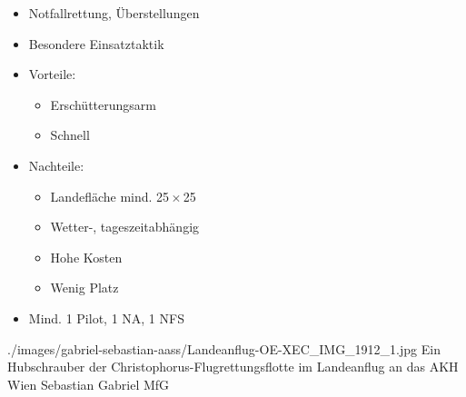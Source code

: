 {
\begin{itemize}
  \item Notfallrettung, Überstellungen 
  \item Besondere Einsatztaktik
  \item Vorteile:
  \begin{itemize}
    \item Erschütterungsarm
    \item Schnell
  \end{itemize}
  \item Nachteile:
  \begin{itemize}
    \item Landefläche mind. {25\,$\times$\,25\Meter*}
    \item Wetter-, tageszeitabhängig
    \item Hohe Kosten
    \item Wenig Platz
  \end{itemize}
  \item Mind. 1 Pilot, 1 NA, 1 NFS
\end{itemize}}%
{./images/gabriel-sebastian-aass/Landeanflug-OE-XEC_IMG_1912_1.jpg}%
{Ein Hubschrauber der Christophorus-Flugrettungsflotte im Landeanflug an das AKH
Wien}%
{}%
{Sebastian Gabriel}%
{MfG}%




